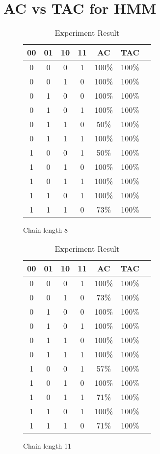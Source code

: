 \documentclass{article}
\begin{document}
\section {AC vs TAC for HMM}

\begin{table}[ht]
  \centering
  \begin{subfigure}[b]{0.45\textwidth}
  \begin{tabular} { c c c c || c || c c}
    00 & 01 & 10 & 11 & AC & TAC \\ \hline
    0 & 0 & 0 & 1 & 100\% & 100\% \\
    0 & 0 & 1 & 0 & 100\% & 100\% \\ 
    0 & 1 & 0 & 0 & 100\% & 100\% \\
    0 & 1 & 0 & 1 & 100\% & 100\% \\
    0 & 1 & 1 & 0 & 50\% & 100\% \\
    0 & 1 & 1 & 1 & 100\% & 100\% \\
    1 & 0 & 0 & 1 & 50\% & 100\% \\
    1 & 0 & 1 & 0 & 100\% & 100\% \\
    1 & 0 & 1 & 1 & 100\% & 100\% \\
    1 & 1 & 0 & 1 & 100\% & 100\% \\
    1 & 1 & 1 & 0 & 73\% & 100\% \\
  \end{tabular}
  \caption{Chain length 8 \label{fig:length-8}}
  \end{subfigure}
  \begin{subfigure}[b]{0.45\textwidth}
  \begin{tabular} { c c c c || c || c c}
    00 & 01 & 10 & 11 & AC & TAC \\ \hline
    0 & 0 & 0 & 1 & 100\% & 100\% \\
    0 & 0 & 1 & 0 & 73\% & 100\% \\ 
    0 & 1 & 0 & 0 & 100\% & 100\% \\
    0 & 1 & 0 & 1 & 100\% & 100\% \\
    0 & 1 & 1 & 0 & 100\% & 100\% \\
    0 & 1 & 1 & 1 & 100\% & 100\% \\
    1 & 0 & 0 & 1 & 57\% & 100\% \\
    1 & 0 & 1 & 0 & 100\% & 100\% \\
    1 & 0 & 1 & 1 & 71\% & 100\% \\
    1 & 1 & 0 & 1 & 100\% & 100\% \\
    1 & 1 & 1 & 0 & 71\% & 100\% \\
  \end{tabular}
  \caption{Chain length 11 \label{fig:length-11}}
\end{subfigure}
\caption{Experiment Result} \label{fig:exp}
\end{table}
\end{document}
